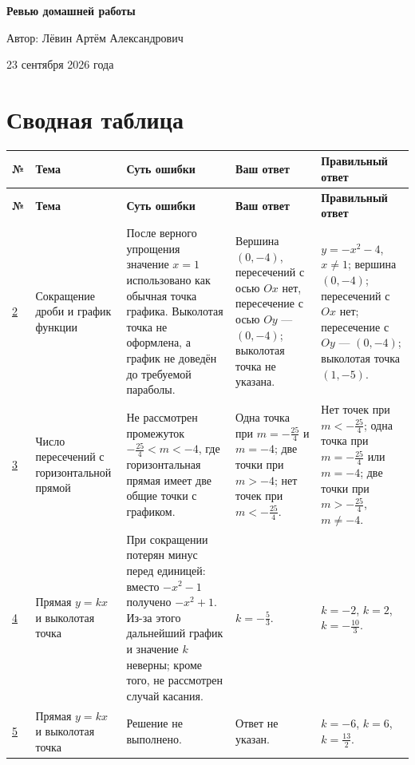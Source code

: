 \documentclass[12pt,a4paper]{article}
\begin{document}
\begin{titlepage}
\centering
\vspace*{0.22\textheight}
{\Huge\bfseries Ревью домашней работы\par}
\vspace{2.2cm}
{\Large Автор: Лёвин Артём Александрович\par}
\vspace{1cm}
{\large 23 сентября 2026 года\par}
\vfill
{}
\end{titlepage}

\newpage
\section*{Сводная таблица}
\small
\setlength{\tabcolsep}{3pt}
\begin{longtable}{>{\raggedright\arraybackslash}p{1.0cm}
                  >{\raggedright\arraybackslash}p{2.2cm}
                  >{\raggedright\arraybackslash}p{4.1cm}
                  >{\raggedright\arraybackslash}p{3.4cm}
                  >{\raggedright\arraybackslash}p{4.0cm}}
\toprule
\textbf{№} & \textbf{Тема} & \textbf{Суть ошибки} & \textbf{Ваш ответ} & \textbf{Правильный ответ} \\
\midrule
\endfirsthead
\toprule
\textbf{№} & \textbf{Тема} & \textbf{Суть ошибки} & \textbf{Ваш ответ} & \textbf{Правильный ответ} \\
\midrule
\endhead
\hyperref[task:2]{2} &
Сокращение дроби и график функции &
После верного упрощения значение $x=1$ использовано как обычная точка графика. Выколотая точка не оформлена, а график не доведён до требуемой параболы. &
Вершина $(0,-4)$, пересечений с осью $Ox$ нет, пересечение с осью $Oy$ --- $(0,-4)$; выколотая точка не указана. &
$y=-x^2-4$, $x\ne1$; вершина $(0,-4)$; пересечений с $Ox$ нет; пересечение с $Oy$ --- $(0,-4)$; выколотая точка $(1,-5)$. \\
\midrule
\hyperref[task:3]{3} &
Число пересечений с горизонтальной прямой &
Не рассмотрен промежуток $-\frac{25}{4}<m<-4$, где горизонтальная прямая имеет две общие точки с графиком. &
Одна точка при $m=-\frac{25}{4}$ и $m=-4$; две точки при $m>-4$; нет точек при $m<-\frac{25}{4}$. &
Нет точек при $m<-\frac{25}{4}$; одна точка при $m=-\frac{25}{4}$ или $m=-4$; две точки при $m>-\frac{25}{4}$, $m\ne-4$. \\
\midrule
\hyperref[task:4]{4} &
Прямая $y=kx$ и выколотая точка &
При сокращении потерян минус перед единицей: вместо $-x^2-1$ получено $-x^2+1$. Из-за этого дальнейший график и значение $k$ неверны; кроме того, не рассмотрен случай касания. &
$k=-\frac{5}{3}$. &
$k=-2$, $k=2$, $k=-\frac{10}{3}$. \\
\midrule
\hyperref[task:5]{5} &
Прямая $y=kx$ и выколотая точка &
Решение не выполнено. &
Ответ не указан. &
$k=-6$, $k=6$, $k=\frac{13}{2}$. \\
\bottomrule
\end{longtable}
\normalsize
\end{document}
